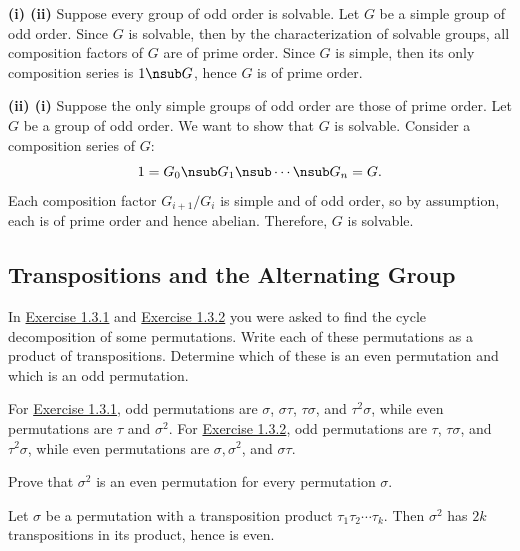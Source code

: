 \begin{sol}
    \textbf{(i) \rightimp (ii)} Suppose every group of odd order is solvable. Let $G$ be a simple group of odd order. Since $G$ is solvable, then by the characterization of solvable groups, all composition factors of $G$ are of prime order. Since $G$ is simple, then its only composition series is $1 \nsub G$, hence $G$ is of prime order.

    \noindent \textbf{(ii) \rightimp (i)} Suppose the only simple groups of odd order are those of prime order. Let $G$ be a group of odd order. We want to show that $G$ is solvable. Consider a composition series of $G$:
    \[1 = G_0 \nsub G_1 \nsub \cdots \nsub G_n = G.\]
    Each composition factor $G_{i+1}/G_i$ is simple and of odd order, so by assumption, each is of prime order and hence abelian. Therefore, $G$ is solvable.
\end{sol}

\newpage

\subsection{Transpositions and the Alternating Group}

\begin{exercise}\label{ex3.5.1}
    In \hyperref[ex1.3.1]{Exercise 1.3.1} and \hyperref[ex1.3.2]{Exercise 1.3.2} you were asked to find the cycle decomposition of some permutations. Write each of these permutations as a product of transpositions. Determine which of these is an even permutation and which is an odd permutation.
\end{exercise}

\begin{sol}
    For \hyperref[ex1.3.1]{Exercise 1.3.1}, odd permutations are $\sigma$, $\sigma\tau$, $\tau\sigma$, and $\tau^2\sigma$, while even permutations are $\tau$ and $\sigma^2$. For \hyperref[ex1.3.2]{Exercise 1.3.2}, odd permutations are $\tau$, $\tau\sigma$, and $\tau^2\sigma$, while even permutations are $\sigma, \sigma^2$, and $\sigma\tau$.
\end{sol}

\begin{exercise}\label{ex3.5.2}
    Prove that $\sigma^2$ is an even permutation for every permutation $\sigma$.
\end{exercise}

\begin{sol}
    Let $\sigma$ be a permutation with a transposition product $\tau_1\tau_2 \cdots \tau_k$. Then $\sigma^2$ has $2k$ transpositions in its product, hence is even.
\end{sol}


